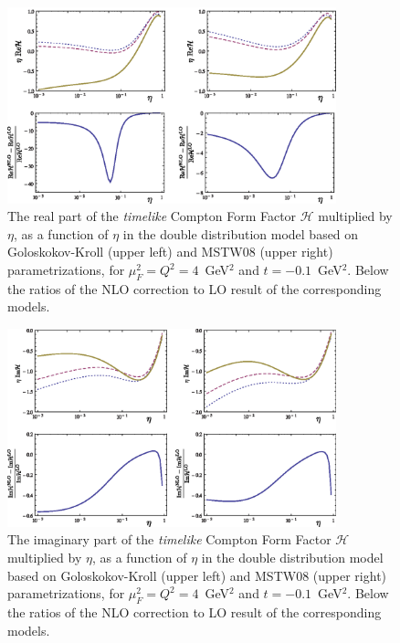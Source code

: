\begin{figure}[hp]
\begin{center}
  \includegraphics[width= 0.85\textwidth]{TCS_Re_2x2_nice.eps} 
\caption{The real part of the {\it timelike} Compton Form Factor
$\mathcal{H}$ multiplied by $\eta$, as a function of $\eta$ in the double
distribution model based on Goloskokov-Kroll (upper left) and MSTW08 (upper
right) parametrizations, for $\mu_F^2=Q^2=4$~GeV$^2$ and $t=-0.1$~GeV$^2$.
Below the ratios of the NLO correction to LO result of the corresponding
models.}
\label{fig:TCSRe2x2}
\end{center}
\end{figure}
\begin{figure}[ht]
\begin{center}
  \includegraphics[width= 0.85\textwidth]{TCS_Im_2x2_nice.eps} 
\caption{The imaginary part of the {\it timelike} Compton Form Factor
$\mathcal{H}$ multiplied by $\eta$, as a function of $\eta$ in the double
distribution model based on Goloskokov-Kroll (upper left) and MSTW08 (upper
right) parametrizations, for $\mu_F^2=Q^2=4$~GeV$^2$ and $t=-0.1$~GeV$^2$.
Below the ratios of the NLO correction to LO result of the corresponding
models.}
\label{fig:TCSIm2x2}
\end{center}
\end{figure}
